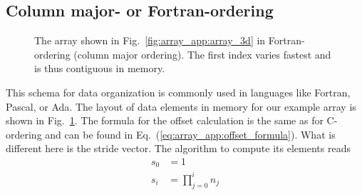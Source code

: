\subsection{Column major- or Fortran-ordering}\label{sec:f_ordering}
\begin{figure}[tb]
\centering
\begin{minipage}{0.5\linewidth}
\centering
{}
\end{minipage}
\hfill
\begin{minipage}{0.4\linewidth}
\caption{{\small\label{fig:array_app:array_3d_forder}
The array shown in Fig.~\ref{fig:array_app:array_3d} in Fortran-ordering (column major
ordering). The first index varies fastest and is thus contiguous in memory. 
}}
\end{minipage}
\end{figure}
This schema for data organization is commonly used in languages like Fortran,
Pascal, or Ada. The layout of data elements in memory for our example array is
shown in Fig.~\ref{fig:array_app:array_3d_forder}. The formula for the offset
calculation is the same as for C-ordering and can be found  in
Eq.~(\ref{eq:array_app:offset_formula}). What is different here is the stride
vector. The algorithm to compute its elements reads
\begin{align}
    s_0 &= 1 \\
    s_i &= \prod_{j=0}^in_j
\end{align}

